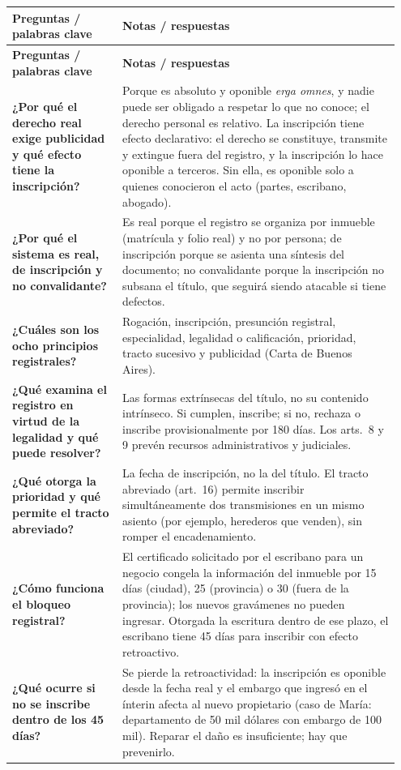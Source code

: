 \documentclass[12pt,oneside]{book}
\makeatletter
\newenvironment{cornell}{%
    \par\vspace{0.5em}
    \noindent
    \begin{longtable}{@{}>{\raggedright\arraybackslash}p{0.27\linewidth}
                         >{\raggedright\arraybackslash}p{0.68\linewidth}@{}}
    \toprule
    \textbf{Preguntas / palabras clave} & \textbf{Notas / respuestas} \\
    \midrule
    \endfirsthead
    \toprule
    \textbf{Preguntas / palabras clave} & \textbf{Notas / respuestas} \\
    \midrule
    \endhead
}{%
    \bottomrule
    \end{longtable}
}
\makeatother
\begin{document}
\begin{cornell}
\textbf{¿Por qué el derecho real exige publicidad y qué efecto tiene la inscripción?} &
Porque es absoluto y oponible \textit{erga omnes}, y nadie puede ser obligado a respetar lo que no conoce; el derecho personal es relativo. La inscripción tiene efecto declarativo: el derecho se constituye, transmite y extingue fuera del registro, y la inscripción lo hace oponible a terceros. Sin ella, es oponible solo a quienes conocieron el acto (partes, escribano, abogado). \\

\textbf{¿Por qué el sistema es real, de inscripción y no convalidante?} &
Es real porque el registro se organiza por inmueble (matrícula y folio real) y no por persona; de inscripción porque se asienta una síntesis del documento; no convalidante porque la inscripción no subsana el título, que seguirá siendo atacable si tiene defectos. \\

\textbf{¿Cuáles son los ocho principios registrales?} &
Rogación, inscripción, presunción registral, especialidad, legalidad o calificación, prioridad, tracto sucesivo y publicidad (Carta de Buenos Aires). \\

\textbf{¿Qué examina el registro en virtud de la legalidad y qué puede resolver?} &
Las formas extrínsecas del título, no su contenido intrínseco. Si cumplen, inscribe; si no, rechaza o inscribe provisionalmente por 180 días. Los arts.~8 y 9 prevén recursos administrativos y judiciales. \\

\textbf{¿Qué otorga la prioridad y qué permite el tracto abreviado?} &
La fecha de inscripción, no la del título. El tracto abreviado (art.~16) permite inscribir simultáneamente dos transmisiones en un mismo asiento (por ejemplo, herederos que venden), sin romper el encadenamiento. \\

\textbf{¿Cómo funciona el bloqueo registral?} &
El certificado solicitado por el escribano para un negocio congela la información del inmueble por 15 días (ciudad), 25 (provincia) o 30 (fuera de la provincia); los nuevos gravámenes no pueden ingresar. Otorgada la escritura dentro de ese plazo, el escribano tiene 45 días para inscribir con efecto retroactivo. \\

\textbf{¿Qué ocurre si no se inscribe dentro de los 45 días?} &
Se pierde la retroactividad: la inscripción es oponible desde la fecha real y el embargo que ingresó en el ínterin afecta al nuevo propietario (caso de María: departamento de 50 mil dólares con embargo de 100 mil). Reparar el daño es insuficiente; hay que prevenirlo. \\


\end{cornell}
\end{document}
